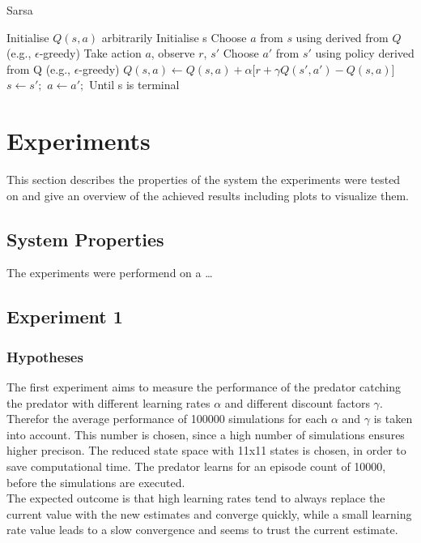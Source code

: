 \documentclass[11pt]{article}
\begin{document}
\begin{algorithm}
\caption{Sarsa}
\begin{algorithmic}
\label{sarsa}
\STATE Initialise $Q(s,a)$ arbitrarily
\STATE Initialise s
\STATE Choose $a$ from $s$ using derived from $Q$ (e.g., $\epsilon$-greedy)
\STATE Take action $a$, observe $r$, $s'$
\STATE Choose $a'$ from $s'$ using policy derived from Q (e.g., $\epsilon$-greedy)
\STATE $Q(s,a) \leftarrow Q(s,a) + \alpha \lbrack r + \gamma Q(s',a') - Q(s,a)\rbrack$
\STATE $s \leftarrow s';$ $a \leftarrow a';$
\ENDFOR
\STATE Until s is terminal
\ENDFOR
\end{algorithmic}
\end{algorithm}


\section{Experiments}
This section describes the properties of the system the experiments were tested on and give an overview of the achieved results including plots to visualize them.

\subsection{System Properties}
The experiments were performend on a \dots

\subsection{Experiment 1}

\subsubsection{Hypotheses}
The first experiment aims to measure the performance of the predator catching the predator with different learning rates $\alpha$ and different discount factors $\gamma$. Therefor the average performance of 100000 simulations for each $\alpha$ and $\gamma$ is  taken into account. This number is chosen, since a high number of simulations ensures higher precison. The reduced state space  with 11x11 states is chosen, in order to save computational time. The predator learns for an episode count of 10000, before the simulations are executed.\\
The expected outcome is that high learning rates tend to always replace the current value with the new estimates and converge quickly, while a small learning rate value leads to a slow convergence and seems to trust the current estimate. ~\cite{dar}
\end{document}
